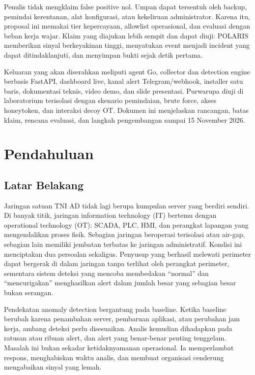 \documentclass[12pt,a4paper]{article}
\begin{document}
Penulis tidak mengklaim false positive nol. Umpan dapat tersentuh oleh backup, pemindai kerentanan, alat konfigurasi, atau kekeliruan administrator. Karena itu, proposal ini memakai tier kepercayaan, allowlist operasional, dan evaluasi dengan beban kerja wajar. Klaim yang diajukan lebih sempit dan dapat diuji: POLARIS memberikan sinyal berkeyakinan tinggi, menyatukan event menjadi incident yang dapat ditindaklanjuti, dan menyimpan bukti sejak detik pertama.

Keluaran yang akan diserahkan meliputi agent Go, collector dan detection engine berbasis FastAPI, dashboard live, kanal alert Telegram/webhook, installer satu baris, dokumentasi teknis, video demo, dan slide presentasi. Purwarupa diuji di laboratorium terisolasi dengan skenario pemindaian, brute force, akses honeytoken, dan interaksi decoy OT. Dokumen ini menjelaskan rancangan, batas klaim, rencana evaluasi, dan langkah pengembangan sampai 15 November 2026.

\section{Pendahuluan}

\subsection{Latar Belakang}

Jaringan satuan TNI AD tidak lagi berupa kumpulan server yang berdiri sendiri. Di banyak titik, jaringan information technology (IT) bertemu dengan operational technology (OT): SCADA, PLC, HMI, dan perangkat lapangan yang mengendalikan proses fisik. Sebagian jaringan beroperasi terisolasi atau air-gap, sebagian lain memiliki jembatan terbatas ke jaringan administratif. Kondisi ini menciptakan dua persoalan sekaligus. Penyusup yang berhasil melewati perimeter dapat bergerak di dalam jaringan tanpa terlihat oleh perangkat perimeter, sementara sistem deteksi yang mencoba membedakan ``normal'' dan ``mencurigakan'' menghasilkan alert dalam jumlah besar yang sebagian besar bukan serangan.

Pendekatan anomaly detection bergantung pada baseline. Ketika baseline berubah karena penambahan server, pembaruan aplikasi, atau perubahan jam kerja, ambang deteksi perlu disesuaikan. Analis kemudian dihadapkan pada ratusan atau ribuan alert, dan alert yang benar-benar penting tenggelam. Masalah ini bukan sekadar ketidaknyamanan operasional. Ia memperlambat respons, menghabiskan waktu analis, dan membuat organisasi cenderung mengabaikan sinyal yang lemah.
\end{document}
